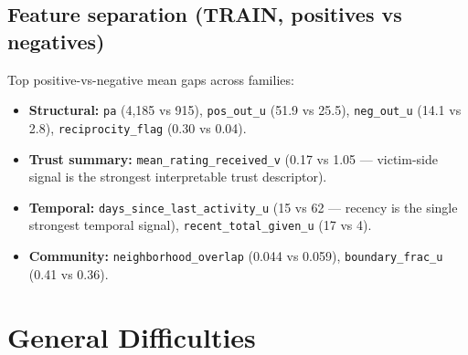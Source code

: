 \documentclass[11pt,a4paper]{article}
\newcommand{\code}[1]{\texttt{#1}}
\begin{document}
\subsection{Feature separation (TRAIN, positives vs negatives)}
Top positive-vs-negative mean gaps across families:
\begin{itemize}[nosep]
  \item \textbf{Structural:} \code{pa} (4{,}185 vs 915), \code{pos\_out\_u}
        (51.9 vs 25.5), \code{neg\_out\_u} (14.1 vs 2.8),
        \code{reciprocity\_flag} (0.30 vs 0.04).
  \item \textbf{Trust summary:} \code{mean\_rating\_received\_v} (0.17 vs
        1.05 --- victim-side signal is the strongest interpretable trust
        descriptor).
  \item \textbf{Temporal:} \code{days\_since\_last\_activity\_u} (15 vs 62
        --- recency is the single strongest temporal signal),
        \code{recent\_total\_given\_u} (17 vs 4).
  \item \textbf{Community:} \code{neighborhood\_overlap} (0.044 vs 0.059),
        \code{boundary\_frac\_u} (0.41 vs 0.36).
\end{itemize}

\section{General Difficulties}
\end{document}
